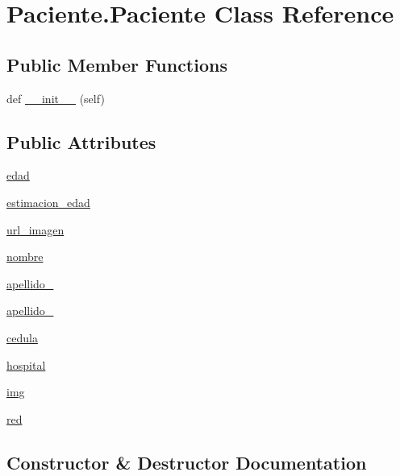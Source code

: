 \hypertarget{class_paciente_1_1_paciente}{}\section{Paciente.\+Paciente Class Reference}
\label{class_paciente_1_1_paciente}
\subsection*{Public Member Functions}
\begin{DoxyCompactItemize}
\item 
def \mbox{\hyperlink{class_paciente_1_1_paciente_a2c88db03c95c828f1d0f58e9d32ea355}{\+\_\+\+\_\+init\+\_\+\+\_\+}} (self)
\end{DoxyCompactItemize}
\subsection*{Public Attributes}
\begin{DoxyCompactItemize}
\item 
\mbox{\hyperlink{class_paciente_1_1_paciente_abf70fff36082e22e22c2235768375de3}{edad}}
\item 
\mbox{\hyperlink{class_paciente_1_1_paciente_af256a15938714b75d23283e3ff8fad02}{estimacion\+\_\+edad}}
\item 
\mbox{\hyperlink{class_paciente_1_1_paciente_a5af3b0cc2e0a1469d603f2efea44df45}{url\+\_\+imagen}}
\item 
\mbox{\hyperlink{class_paciente_1_1_paciente_a0df4d67d7a1e91c7cc72b14ca7bd7b78}{nombre}}
\item 
\mbox{\hyperlink{class_paciente_1_1_paciente_a5b4864356ffb572e967ac84c8f1ef563}{apellido\+\_}}
\item 
\mbox{\hyperlink{class_paciente_1_1_paciente_aa6013db207c8415f9878c0a292ab954d}{apellido\+\_}}
\item 
\mbox{\hyperlink{class_paciente_1_1_paciente_ad98665ddc10fc8bc5ff0b6a43ee726f1}{cedula}}
\item 
\mbox{\hyperlink{class_paciente_1_1_paciente_a0c4e9e5166be854ff5dad10248fdb85c}{hospital}}
\item 
\mbox{\hyperlink{class_paciente_1_1_paciente_a2dd715404933b0c95678e27418e139f7}{img}}
\item 
\mbox{\hyperlink{class_paciente_1_1_paciente_ad5dd0b61b2f837ec4f5407ee2a5bb605}{red}}
\end{DoxyCompactItemize}


\subsection{Constructor \& Destructor Documentation}
\mbox{\label{class_paciente_1_1_paciente_a2c88db03c95c828f1d0f58e9d32ea355}} 
